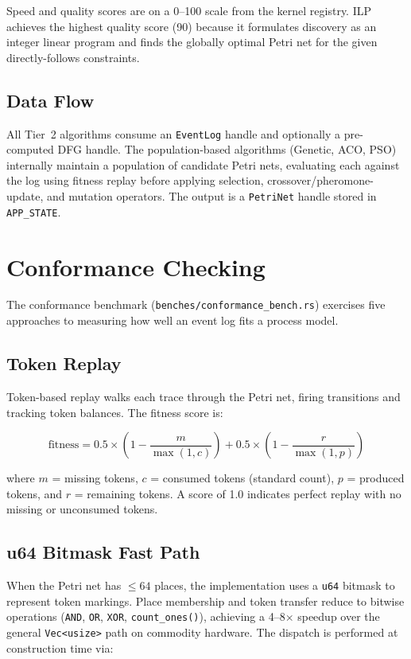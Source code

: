 \documentclass[11pt,a4paper]{article}
\begin{document}
Speed and quality scores are on a 0--100 scale from the kernel registry.
ILP achieves the highest quality score (90) because it formulates
discovery as an integer linear program and finds the globally optimal
Petri net for the given directly-follows constraints.

\subsection{Data Flow}

All Tier~2 algorithms consume an \texttt{EventLog} handle and optionally
a pre-computed DFG handle. The population-based algorithms
(Genetic, ACO, PSO) internally maintain a population of candidate
Petri nets, evaluating each against the log using fitness replay before
applying selection, crossover/pheromone-update, and mutation operators.
The output is a \texttt{PetriNet} handle stored in \texttt{APP\_STATE}.

\section{Conformance Checking}
\label{sec:conformance}

The conformance benchmark (\texttt{benches/conformance\_bench.rs}) exercises
five approaches to measuring how well an event log fits a process model.

\subsection{Token Replay}

Token-based replay walks each trace through the Petri net, firing
transitions and tracking token balances. The fitness score is:

\[
  \text{fitness} = 0.5 \times \left(1 - \frac{m}{\max(1,c)}\right) + 0.5 \times \left(1 - \frac{r}{\max(1,p)}\right)
\]

where $m$ = missing tokens, $c$ = consumed tokens (standard count),
$p$ = produced tokens, and $r$ = remaining tokens.
A score of 1.0 indicates perfect replay with no missing or unconsumed tokens.

\subsection{u64 Bitmask Fast Path}

When the Petri net has $\leq 64$ places, the implementation uses a
\texttt{u64} bitmask to represent token markings. Place membership and
token transfer reduce to bitwise operations (\texttt{AND}, \texttt{OR},
\texttt{XOR}, \texttt{count\_ones()}), achieving a 4--8$\times$ speedup
over the general \texttt{Vec<usize>} path on commodity hardware.
The dispatch is performed at construction time via:
\end{document}
